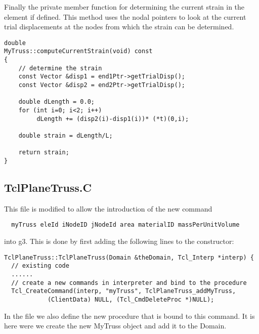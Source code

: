 \documentclass[12pt]{article}
\begin{document}
Finally the private member function for determining the current strain
in the element if defined. This method uses the nodal pointers to look
at the current trial displacements at the nodes from which the strain
can be determined. 

{\sf\small
\begin{verbatim}
double
MyTruss::computeCurrentStrain(void) const
{
    // determine the strain
    const Vector &disp1 = end1Ptr->getTrialDisp();
    const Vector &disp2 = end2Ptr->getTrialDisp();	

    double dLength = 0.0;
    for (int i=0; i<2; i++)
         dLength += (disp2(i)-disp1(i))* (*t)(0,i);
    
    double strain = dLength/L;

    return strain;
}
\end{verbatim} }

\subsection {\sf TclPlaneTruss.C}
This file is modified to allow the introduction of the new command
{\sf \begin{verbatim}
  myTruss eleId iNodeID jNodeId area materialID massPerUnitVolume
\end{verbatim} } 
\noindent into g3. This is done by first adding the following lines to
the constructor: 

{\sf \begin{verbatim}
TclPlaneTruss::TclPlaneTruss(Domain &theDomain, Tcl_Interp *interp) {
  // existing code
  ......
  // create a new commands in interpreter and bind to the procedure  
  Tcl_CreateCommand(interp, "myTruss", TclPlaneTruss_addMyTruss,
		    (ClientData) NULL, (Tcl_CmdDeleteProc *)NULL);  
\end{verbatim} } 

In the file we also define the new procedure that is bound to this
command. It is here were we create the new MyTruss object and add it
to the Domain.
\end{document}

